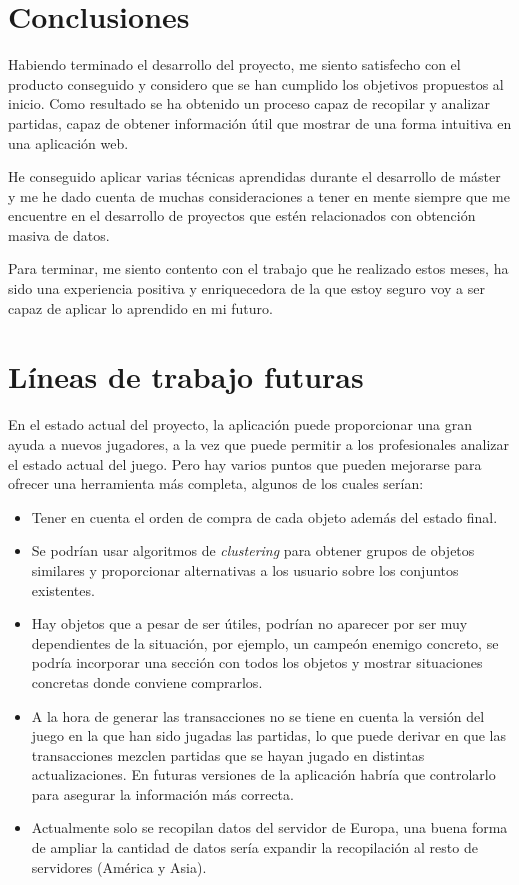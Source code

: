 
\section{Conclusiones}
Habiendo terminado el desarrollo del proyecto, me siento satisfecho con el producto conseguido y considero que se han cumplido los objetivos propuestos al inicio. Como resultado se ha obtenido un proceso capaz de recopilar y analizar partidas, capaz de obtener información útil que mostrar de una forma intuitiva en una aplicación web.

He conseguido aplicar varias técnicas aprendidas durante el desarrollo de máster y me he dado cuenta de muchas consideraciones a tener en mente siempre que me encuentre en el desarrollo de proyectos que estén relacionados con obtención masiva de datos.

Para terminar, me siento contento con el trabajo que he realizado estos meses, ha sido una experiencia positiva y enriquecedora de la que estoy seguro voy a ser capaz de aplicar lo aprendido en mi futuro.

\section{Líneas de trabajo futuras}
En el estado actual del proyecto, la aplicación puede proporcionar una gran ayuda a nuevos jugadores, a la vez que puede permitir a los profesionales analizar el estado actual del juego. Pero hay varios puntos que pueden mejorarse para ofrecer una herramienta más completa, algunos de los cuales serían:
\begin{itemize}
	\item Tener en cuenta el orden de compra de cada objeto además del estado final.
	\item Se podrían usar algoritmos de \textit{clustering} para obtener grupos de objetos similares y proporcionar alternativas a los usuario sobre los conjuntos existentes.
	\item Hay objetos que a pesar de ser útiles, podrían no aparecer por ser muy dependientes de la situación, por ejemplo, un campeón enemigo concreto, se podría incorporar una sección con todos los objetos y mostrar situaciones concretas donde conviene comprarlos.
	\item A la hora de generar las transacciones no se tiene en cuenta la versión del juego en la que han sido jugadas las partidas, lo que puede derivar en que las transacciones mezclen partidas que se hayan jugado en distintas actualizaciones. En futuras versiones de la aplicación habría que controlarlo para asegurar la información más correcta.
	\item Actualmente solo se recopilan datos del servidor de Europa, una buena forma de ampliar la cantidad de datos sería expandir la recopilación al resto de servidores (América y Asia).
\end{itemize}
